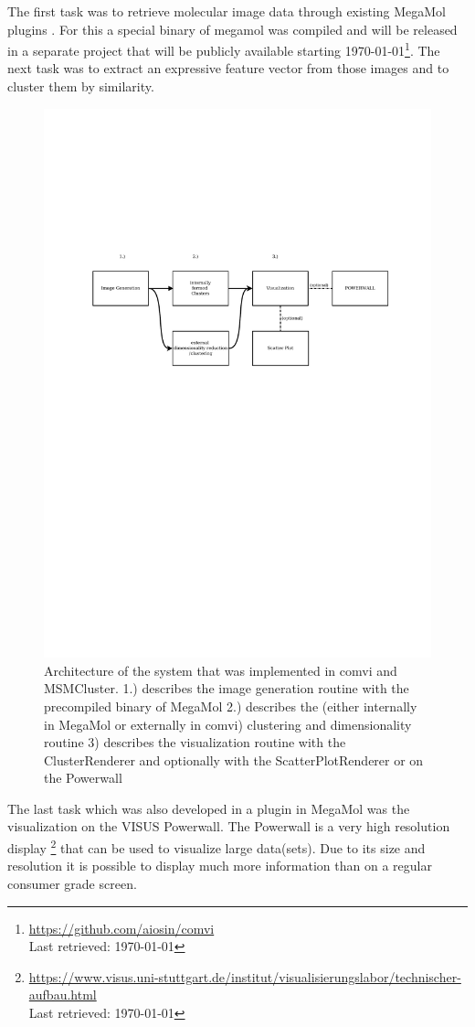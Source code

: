 \documentclass[journal]{vgtc}       %
\begin{document}
The first task was to retrieve molecular image data through existing MegaMol plugins \cite{molecularmaps}. For this a special binary of megamol was compiled and will be released in a separate project that will be publicly available starting \today \footnote{\url{https://github.com/aiosin/comvi}\\ Last retrieved: \today}.
The next task was to extract an expressive feature vector from those images and to cluster them by similarity.
\begin{figure}[htbp]
	\begin{center}
		\includegraphics[page=1,scale = .1,viewport= 150 650 700 900 ,width=.75\linewidth]{arch}

	\end{center}
	\caption{\label{fig:arch} Architecture of the system that was implemented in comvi and MSMCluster. 1.) describes the image generation routine with the precompiled binary of MegaMol 2.) describes the (either internally in MegaMol or externally in comvi) clustering and dimensionality routine 3) describes the visualization routine with the ClusterRenderer and optionally with the ScatterPlotRenderer or on the Powerwall }
\end{figure} 
The last task which was also developed in a plugin in MegaMol was the visualization on the VISUS Powerwall. The Powerwall is a very high resolution display \footnote{\url{https://www.visus.uni-stuttgart.de/institut/visualisierungslabor/technischer-aufbau.html} \\ Last retrieved: \today } that can be used to visualize large data(sets). Due to its size and resolution it is possible to display much more information than on a regular consumer grade screen. 
\end{document}
